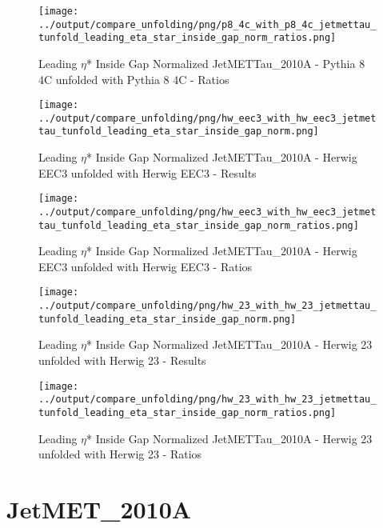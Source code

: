 \documentclass[11pt]{book}
\begin{document}
\begin{figure}[ht]
\centering
\texttt{[image: ../output/compare\_unfolding/png/p8\_4c\_with\_p8\_4c\_jetmettau\_tunfold\_leading\_eta\_star\_inside\_gap\_norm\_ratios.png]}
\caption{Leading $\eta$* Inside Gap Normalized JetMETTau\_2010A - Pythia 8 4C unfolded with Pythia 8 4C - Ratios}
\label{p8_p8_jetmettau_tunfold_leading_eta_star_inside_gap_norm_b}
\end{figure}

\begin{figure}[ht]
\centering
\texttt{[image: ../output/compare\_unfolding/png/hw\_eec3\_with\_hw\_eec3\_jetmettau\_tunfold\_leading\_eta\_star\_inside\_gap\_norm.png]}
\caption{Leading $\eta$* Inside Gap Normalized JetMETTau\_2010A - Herwig EEC3 unfolded with Herwig EEC3 - Results}
\label{hw_eec3_hw_eec3_jetmettau_tunfold_leading_eta_star_inside_gap_norm_a}
\end{figure}

\begin{figure}[ht]
\centering
\texttt{[image: ../output/compare\_unfolding/png/hw\_eec3\_with\_hw\_eec3\_jetmettau\_tunfold\_leading\_eta\_star\_inside\_gap\_norm\_ratios.png]}
\caption{Leading $\eta$* Inside Gap Normalized JetMETTau\_2010A - Herwig EEC3 unfolded with Herwig EEC3 - Ratios}
\label{hw_eec3_hw_eec3_jetmettau_tunfold_leading_eta_star_inside_gap_norm_b}
\end{figure}

\begin{figure}[ht]
\centering
\texttt{[image: ../output/compare\_unfolding/png/hw\_23\_with\_hw\_23\_jetmettau\_tunfold\_leading\_eta\_star\_inside\_gap\_norm.png]}
\caption{Leading $\eta$* Inside Gap Normalized JetMETTau\_2010A - Herwig 23 unfolded with Herwig 23 - Results}
\label{hw_23_hw_23_jetmettau_tunfold_leading_eta_star_inside_gap_norm_a}
\end{figure}

\begin{figure}[ht]
\centering
\texttt{[image: ../output/compare\_unfolding/png/hw\_23\_with\_hw\_23\_jetmettau\_tunfold\_leading\_eta\_star\_inside\_gap\_norm\_ratios.png]}
\caption{Leading $\eta$* Inside Gap Normalized JetMETTau\_2010A - Herwig 23 unfolded with Herwig 23 - Ratios}
\label{hw_23_hw_23_jetmettau_tunfold_leading_eta_star_inside_gap_norm_b}
\end{figure}


\clearpage
\section{JetMET\_2010A}
\end{document}
